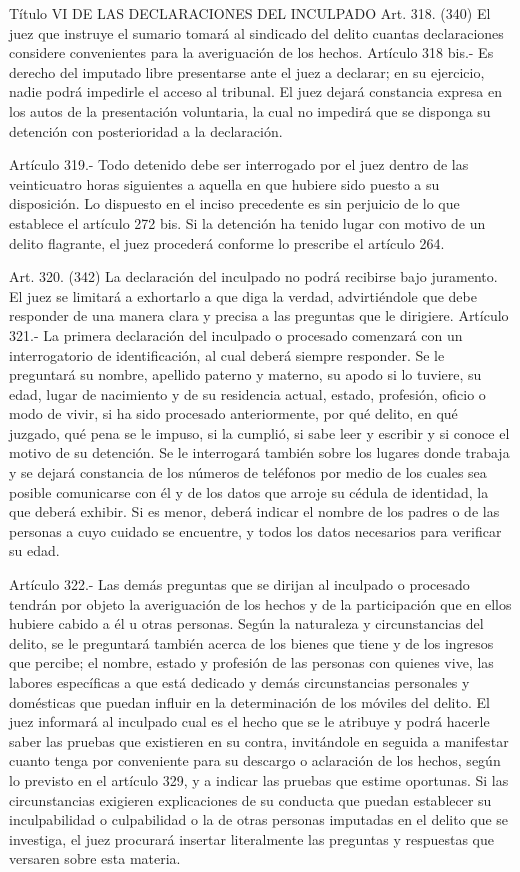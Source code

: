     Título VI
    DE LAS DECLARACIONES DEL INCULPADO
    Art. 318. (340) El juez que instruye el sumario tomará al sindicado del delito cuantas declaraciones considere convenientes para la averiguación de los hechos.
    Artículo 318 bis.- Es derecho del imputado libre presentarse ante el juez a declarar; en su ejercicio, nadie podrá impedirle el acceso al tribunal.
    El juez dejará constancia expresa en los autos de la presentación voluntaria, la cual no impedirá que se disponga su detención con posterioridad a la declaración.

    Artículo 319.- Todo detenido debe ser interrogado por el juez dentro de las veinticuatro horas siguientes a aquella en que hubiere sido puesto a su disposición. Lo dispuesto en el inciso precedente es sin perjuicio de lo que establece el artículo 272 bis.
    Si la detención ha tenido lugar con motivo de un delito flagrante, el juez procederá conforme lo prescribe el artículo 264.

    Art. 320. (342) La declaración del inculpado no podrá recibirse bajo juramento. El juez se limitará a exhortarlo a que diga la verdad, advirtiéndole que debe responder de una manera clara y precisa a las preguntas que le dirigiere.
    Artículo 321.- La primera declaración del inculpado o procesado comenzará con un interrogatorio de identificación, al cual deberá siempre responder. Se le preguntará su nombre, apellido paterno y materno, su apodo si lo tuviere, su edad, lugar de nacimiento y de su residencia actual, estado, profesión, oficio o modo de vivir, si ha sido procesado anteriormente, por qué delito, en qué juzgado, qué pena se le impuso, si la cumplió, si sabe leer y escribir y si conoce el motivo de su detención.  Se le interrogará también sobre los lugares donde trabaja y se dejará constancia de los números de teléfonos por medio de los cuales sea posible comunicarse con él y de los datos que arroje su cédula de identidad, la que deberá exhibir.
    Si es menor, deberá indicar el nombre de los padres o de las personas a cuyo cuidado se encuentre, y todos los datos necesarios para verificar su edad.

    Artículo 322.- Las demás preguntas que se dirijan al inculpado o procesado tendrán por objeto la averiguación de los hechos y de la participación que en ellos hubiere cabido a él u otras personas.
    Según la naturaleza y circunstancias del delito, se le preguntará también acerca de los bienes que tiene y de los ingresos que percibe; el nombre, estado y profesión de las personas con quienes vive, las labores específicas a que está dedicado y demás circunstancias personales y domésticas que puedan influir en la determinación de los móviles del delito.
    El juez informará al inculpado cual es el hecho que se le atribuye y podrá hacerle saber las pruebas que existieren en su contra, invitándole en seguida a manifestar cuanto tenga por conveniente para su descargo o aclaración de los hechos, según lo previsto en el artículo 329, y a indicar las pruebas que estime oportunas. Si las circunstancias exigieren explicaciones de su conducta que puedan establecer su inculpabilidad o culpabilidad o la de otras personas imputadas en el delito que se investiga, el juez procurará insertar literalmente las preguntas y respuestas que versaren sobre esta materia.

